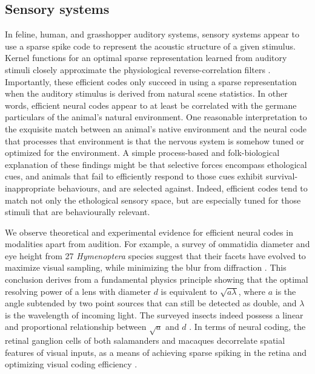 \documentclass[twocolumn]{article}
\begin{document}
\subsection{Sensory systems}
In feline, human, and grasshopper auditory systems\cite{Machens_Gollisch_Kolesnikova_Herz_2005, smith_lewicki_2006}, sensory systems appear to use a sparse spike code to represent the acoustic structure of a given stimulus. Kernel functions for an optimal sparse representation learned from auditory stimuli closely approximate the physiological reverse-correlation filters \cite{smith_lewicki_2006}. Importantly, these efficient codes only succeed in using a sparse representation when the auditory stimulus is derived from natural scene statistics. In other words, efficient neural codes appear to at least be correlated with the germane particulars of the animal's natural environment. One reasonable interpretation to the exquisite match between an animal's native environment and the neural code that processes that environment is that the nervous system is somehow tuned or optimized for the environment. A simple process-based and folk-biological explanation of these findings might be that selective forces encompass ethological cues, and animals that fail to efficiently respond to those cues exhibit survival-inappropriate behaviours, and are selected against. Indeed, efficient codes tend to match not only the ethological sensory space, but are especially tuned for those stimuli that are behaviourally relevant\cite{Machens_Gollisch_Kolesnikova_Herz_2005, machens_herz_2001}. 

We observe theoretical and experimental evidence for efficient neural codes in modalities apart from audition. For example, a survey of ommatidia diameter and eye height from 27 \textit{Hymenoptera} species suggest that their facets have evolved to maximize visual sampling, while minimizing the blur from diffraction \cite{barlow_1952}. This conclusion derives from a fundamental physics principle showing that the optimal resolving power of a lens with diameter $d$ is equivalent to $\sqrt{a\lambda}$, where $a$ is the angle subtended by two point sources that can still be detected as double, and $\lambda$ is the wavelength of incoming light. The surveyed insects indeed possess a linear and proportional relationship between $\sqrt{a}$ and $d$ \cite{barlow_1952}. In terms of neural coding, the retinal ganglion cells of both salamanders and macaques decorrelate spatial features of visual inputs, as a means of achieving sparse spiking in the retina and optimizing visual coding efficiency \cite{Pitkow_Meister_2012}. 
\end{document}
